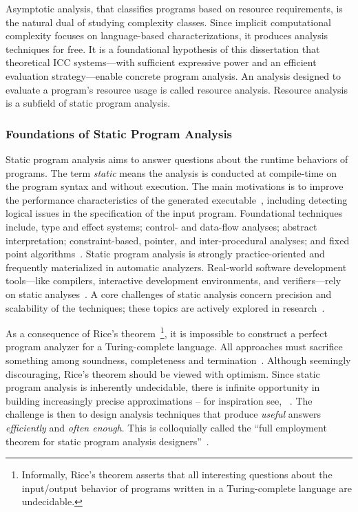 Asymptotic analysis, that classifies programs based on resource requirements, is the natural dual of studying complexity classes.
Since implicit computational complexity focuses on language-based characterizations, it produces analysis techniques for free.
It is a foundational hypothesis of this dissertation that theoretical ICC systems---with sufficient expressive power and an efficient evaluation strategy---enable concrete program analysis.
An analysis designed to evaluate a program's resource usage is called resource analysis.
Resource analysis is a subfield of static program analysis.

\subsubsection{Foundations of Static Program Analysis}\label{static-analysis-basics}

Static program analysis aims to answer questions about the runtime behaviors of programs.
The term \emph{static} means the analysis is conducted at compile-time on the program syntax and without execution.
The main motivations is to improve the performance characteristics of the generated executable~\cite{nielson2010,kennedy2001},
including detecting logical issues in the specification of the input program.
Foundational techniques include, \eg
type and effect systems;
control- and data-flow analyses;
abstract interpretation;
constraint-based, pointer, and inter-procedural analyses;
and fixed point algorithms~\cite{nielson2010,moller2023}.
Static program analysis is strongly practice-oriented and frequently materialized in automatic analyzers.
Real-world software development tools---like compilers, interactive development environments, and verifiers---rely on static analyses~\cite{livshits2015}.
A core challenges of static analysis concern precision and scalability of the techniques;
these topics are actively explored in research~\cite{schiebel2024}.

As a consequence of Rice's theorem~\cite{rice1953}\footnote{
Informally, Rice's theorem asserts that all interesting questions about the input/output behavior of programs written in a Turing-complete language are undecidable.}, it is impossible to construct a perfect program analyzer for a Turing-complete language.
All approaches must sacrifice something among soundness, completeness and termination~\cite{moller2024}.
Although seemingly discouraging, Rice's theorem should be viewed with optimism.
Since static program analysis is inherently undecidable, there is infinite opportunity in building increasingly precise approximations --
for inspiration see, \eg~\textcite{ding2023}.
The challenge is then to design analysis techniques that produce \emph{useful} answers \emph{efficiently} and \emph{often enough}.
This is colloquially called the \enquote{full employment theorem for static program analysis designers}~\cite[p. 4]{moller2023}.

